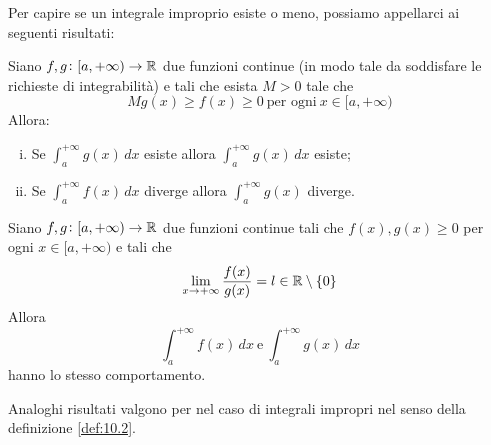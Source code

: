 Per capire se un integrale improprio esiste o meno, possiamo appellarci ai seguenti risultati:
\begin{theorem}
    \label{th:10.1}
    Siano $f, g\colon[a,+\infty)\to \amsbb{R}$ due funzioni continue (in modo tale da soddisfare le richieste di integrabilità) e tali che esista $M>0$ tale che
    \[
    Mg(x)\ge f(x)\ge 0 \ \text{per ogni} \ x\in[a,+\infty)
    \]
    Allora:
    \begin{enumerate}[(i)]
        \item Se $\int_a^{+\infty}g(x)\, dx$ esiste allora $\int_a^{+\infty}g(x)\, dx$ esiste;
        \item Se $\int_a^{+\infty}f(x)\, dx$ diverge allora $\int_a^{+\infty}g(x)$ diverge.
    \end{enumerate}
\end{theorem}
\begin{theorem}
    \label{th:10.2}
    Siano $f,g\colon[a,+\infty)\to \amsbb{R}$ due funzioni continue tali che $f(x), g(x)\ge 0$ per ogni $x\in[a,+\infty)$ e tali che
    \[
    \lim_{x\to+\infty} \frac{f(x)}{g(x)} = l\in\amsbb{R}\setminus\{0\}
    \]
    Allora
    \[
    \int_a^{+\infty}f(x)\, dx \ \text{e} \ \int_a^{+\infty}g(x)\, dx
    \]
    hanno lo stesso comportamento.
\end{theorem}
Analoghi risultati valgono per nel caso di integrali impropri nel senso della definizione \ref{def:10.2}.
